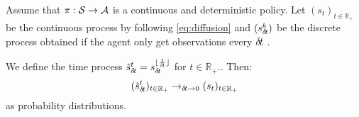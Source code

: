 \begin{theorem}
  Assume that $\pi: {\cal S} \rightarrow {\cal A}$ is a continuous and deterministic policy. Let $(s_t)_{t\in\mathbb{R}_+}$ be the continuous process by following \eqref{eq:diffusion} and $(s_{\delta\hspace{-.1em}t}^k)$ be the discrete process obtained if the agent only get observations every ${\delta\hspace{-.1em}t}$ .

  We define the time process $\tilde s_{\delta\hspace{-.1em}t}^t = s^{\lfloor \frac{t}{{\delta\hspace{-.1em}t}}\rfloor}_{\delta\hspace{-.1em}t}$ for $t\in\mathbb{R_+}$.. Then:
  \begin{equation}
    \label{eq:conv-traj}
    (\tilde s_{\delta\hspace{-.1em}t}^t)_{t\in\mathbb{R}_+} \rightarrow_{{\delta\hspace{-.1em}t} \rightarrow 0} (s_t)_{t\in\mathbb{R}_+}
  \end{equation}
  as probability distributions.
\end{theorem}

